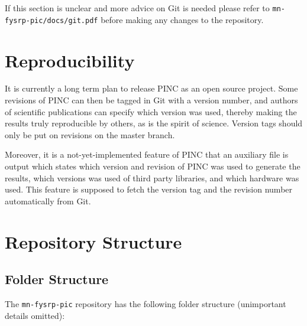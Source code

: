 \documentclass[10pt,a4paper]{article}
\newcommand{\mnfysrppic}{\texttt{mn-fysrp-pic}}
\begin{document}
If this section is unclear and more advice on Git is needed please refer to \texttt{mn-fysrp-pic/docs/git.pdf} before making any changes to the repository.

\section{Reproducibility}
It is currently a long term plan to release PINC as an open source project. Some revisions of PINC can then be tagged in Git with a version number, and authors of scientific publications can specify which version was used, thereby making the results truly reproducible by others, as is the spirit of science. Version tags should only be put on revisions on the master branch.

Moreover, it is a not-yet-implemented feature of PINC that an auxiliary file is output which states which version and revision of PINC was used to generate the results, which versions was used of third party libraries, and which hardware was used. This feature is supposed to fetch the version tag and the revision number automatically from Git.

\section{Repository Structure}

\subsection{Folder Structure}
The \mnfysrppic{} repository has the following folder structure (unimportant details omitted):
\end{document}

